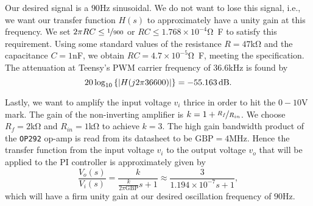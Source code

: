 Our desired signal is a $90$\unit{\hertz} sinusoidal. We do not want to lose
this signal, i.e., we want our transfer function $H(s)$ to approximately have a
unity gain at this frequency. We set $2\pi RC \leq \nicefrac{1}{900}$ or $RC
\leq 1.768 \times 10^{-4}$\unit{\ohm\farad} to satisfy this requirement. Using
some standard values of the resistance $R = 47$\unit{\kilo\ohm} and the
capacitance $C = 1$\unit{\nano\farad}, we obtain $RC = 4.7 \times
10^{-5}$\unit{\ohm\farad}, meeting the specification. The attenuation at
Teensy's PWM carrier frequency of $36.6$\unit{\kilo\hertz} is found by \[ 20
\log_{10}\left\{\abs{H(j 2\pi 36600)}\right\} = -55.163\,\unit{\decibel}. \]

Lastly, we want to amplify the input voltage $v_i$ thrice in order to hit the
$0-10$\unit{\volt} mark. The gain of the non-inverting amplifier is $k = 1 +
\nicefrac{R_f}{R_{in}}$. We choose $R_f = 2$\unit{\kilo\ohm} and $R_{in} =
1$\unit{\kilo\ohm} to achieve $k = 3$. The high gain bandwidth product of the
\texttt{OP292} op-amp is read from its datasheet to be $\text{GBP} =
4$\unit{\mega\hertz}. Hence the transfer function from the input voltage $v_i$
to the output voltage $v_o$ that will be applied to the PI controller is
approximately given by \[ \frac{V_o(s)}{V_i(s)} =
\frac{k}{\frac{k}{2\pi\text{GBP}}s + 1} \approx \frac{3}{1.194\times 10^{-7}s +
1}, \] which will have a firm unity gain at our desired oscillation frequency of
$90$\unit{\hertz}.


